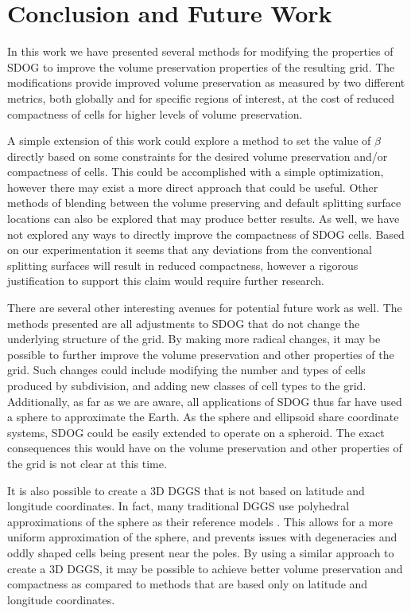 \section{Conclusion and Future Work} \label{sec:conclusion}
In this work we have presented several methods for modifying the properties of SDOG to improve the volume preservation properties of the resulting grid. The modifications provide improved volume preservation as measured by two different metrics, both globally and for specific regions of interest, at the cost of reduced compactness of cells for higher levels of volume preservation. 

A simple extension of this work could explore a method to set the value of $\beta$ directly based on some constraints for the desired volume preservation and/or compactness of cells. This could be accomplished with a simple optimization, however there may exist a more direct approach that could be useful. Other methods of blending between the volume preserving and default splitting surface locations can also be explored that may produce better results. As well, we have not explored any ways to directly improve the compactness of SDOG cells. Based on our experimentation it seems that any deviations from the conventional splitting surfaces will result in reduced compactness, however a rigorous justification to support this claim would require further research.

There are several other interesting avenues for potential future work as well. The methods presented are all adjustments to SDOG that do not change the underlying structure of the grid. By making more radical changes, it may be possible to further improve the volume preservation and other properties of the grid. Such changes could include modifying the number and types of cells produced by subdivision, and adding new classes of cell types to the grid. Additionally, as far as we are aware, all applications of SDOG thus far \cite{yu2009sdog, yu2012large-scale, yu2012lithosphere} have used a sphere to approximate the Earth. As the sphere and ellipsoid share coordinate systems, SDOG could be easily extended to operate on a spheroid. The exact consequences this would have on the volume preservation and other properties of the grid is not clear at this time.

It is also possible to create a 3D DGGS that is not based on latitude and longitude coordinates. In fact, many traditional DGGS use polyhedral approximations of the sphere as their reference models \cite{mahdavi2015survey}. This allows for a more uniform approximation of the sphere, and prevents issues with degeneracies and oddly shaped cells being present near the poles. By using a similar approach to create a 3D DGGS, it may be possible to achieve better volume preservation and compactness as compared to methods that are based only on latitude and longitude coordinates. 


